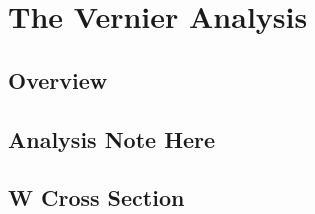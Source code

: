 \chapter{The Vernier Analysis}
\label{ch:vernier_analysis}
\section{Overview}
\section{Analysis Note Here}
\section{W Cross Section}
